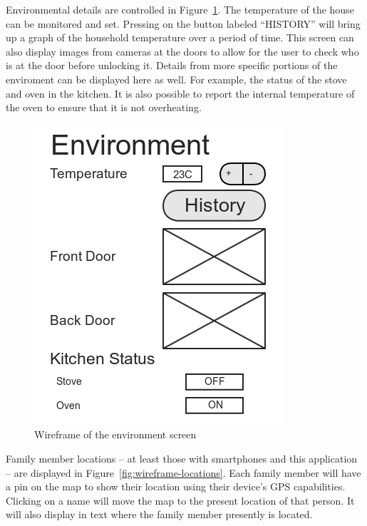 \documentclass{report}
\begin{document}
Environmental details are controlled in Figure~\ref{fig:wireframe-environment}. The
temperature of the house can be monitored and set. Pressing on the button
labeled ``HISTORY'' will bring up a graph of the household temperature over a
period of time. This screen can also display images from cameras at the doors
to allow for the user to check who is at the door before unlocking it.
Details from more specific portions of the enviroment can be displayed here as
well. For example, the status of the stove and oven in the kitchen. It is also
possible to report the internal temperature of the oven to ensure that it is
not overheating.

\begin{figure}[H]
    \centering
    \includegraphics[scale=0.5]{mock_environment}
    \caption[Wireframe of the environment screen]
            {Wireframe of the environment screen}
    \label{fig:wireframe-environment}
\end{figure}

Family member locations -- at least those with smartphones and this
application -- are displayed in Figure~\ref{fig:wireframe-locations}. Each family
member will have a pin on the map to show their location using their device's
GPS capabilities. Clicking on a name will move the map to the present location
of that person. It will also display in text where the family member presently
is located.
\end{document}
